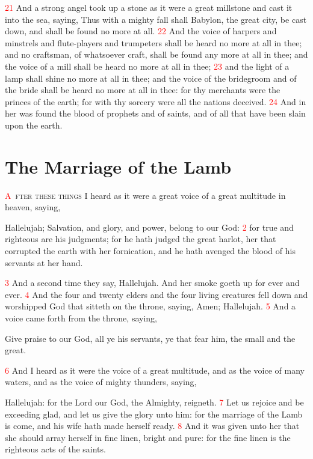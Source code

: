 \documentclass[12pt,twoside]{memoir}
\newcommand{\vnum}[1]{\textcolor{red}{\normalsize{#1}}}
\begin{document}
\vnum{21} And a strong angel took up a stone as it were a great millstone and cast it into the sea, saying, Thus with a mighty fall shall Babylon, the great city, be cast down, and shall be found no more at all. 
\vnum{22} And the voice of harpers and minstrels and flute-players and trumpeters shall be heard no more at all in thee; and no craftsman, of whatsoever craft, shall be found any more at all in thee; and the voice of a mill shall be heard no more at all in thee; 
\vnum{23} and the light of a lamp shall shine no more at all in thee; and the voice of the bridegroom and of the bride shall be heard no more at all in thee: for thy merchants were the princes of the earth; for with thy sorcery were all the nations deceived. 
\vnum{24} And in her was found the blood of prophets and of saints, and of all that have been slain upon the earth.


\chapter{The Marriage of the Lamb}
\lettrine[lines=3,slope=-0.5em]{\textcolor{red}{A}}{\ fter these things} I heard as it were a great voice of a great multitude in heaven, saying,

Hallelujah; Salvation, and glory, and power, belong to our God: 
\vnum{2} for true and righteous are his judgments; for he hath judged the great harlot, her that corrupted the earth with her fornication, and he hath avenged the blood of his servants at her hand.

\vnum{3} And a second time they say, Hallelujah. And her smoke goeth up for ever and ever. 
\vnum{4} And the four and twenty elders and the four living creatures fell down and worshipped God that sitteth on the throne, saying, Amen; Hallelujah. 
\vnum{5} And a voice came forth from the throne, saying,

Give praise to our God, all ye his servants, ye that fear him, the small and the great.

\vnum{6} And I heard as it were the voice of a great multitude, and as the voice of many waters, and as the voice of mighty thunders, saying,

Hallelujah: for the Lord our God, the Almighty, reigneth. 
\vnum{7} Let us rejoice and be exceeding glad, and let us give the glory unto him: for the marriage of the Lamb is come, and his wife hath made herself ready. 
\vnum{8} And it was given unto her that she should array herself in fine linen, bright and pure: for the fine linen is the righteous acts of the saints.
\end{document}
